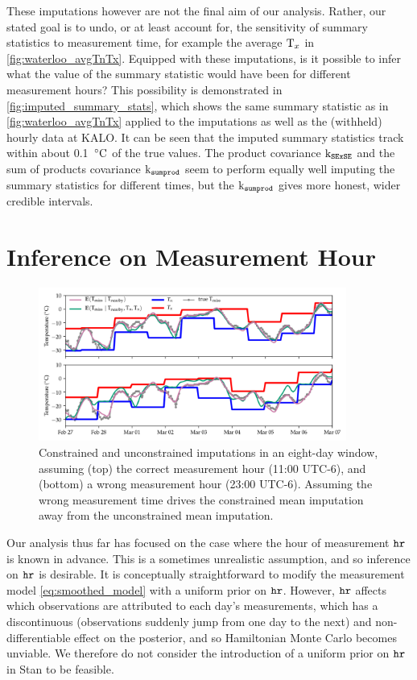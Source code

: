 \documentclass[12pt]{article}
\begin{document}
These imputations however are not the final aim of our analysis.
Rather, our stated goal is to undo, or at least account for, the sensitivity of summary statistics to measurement time, for example the average \(\Tx\) in \autoref{fig:waterloo_avgTnTx}.
Equipped with these imputations, is it possible to infer what the value of the summary statistic would have been for different measurement hours?
This possibility is demonstrated in \autoref{fig:imputed_summary_stats},
which shows the same summary statistic as in \autoref{fig:waterloo_avgTnTx} applied to the imputations as well as the (withheld) hourly data at KALO.
It can be seen that the imputed summary statistics track within about 0.1~\(\degreeC\) of the true values.
The product covariance \(\kSESE\) and the sum of products covariance \(\ksumprod\) seem to perform equally well imputing the summary statistics for different times, but the \(\ksumprod\) gives more honest, wider credible intervals.

\section{Inference on Measurement Hour}\label{inference-on-measurement-hour}

\begin{figure}[tbp]
\centering
\includegraphics[width=0.9\textwidth,height=0.4\textheight,keepaspectratio]{../figures/measure_hour_example.png}
\caption{\label{fig:measure_hour_example} Constrained and unconstrained imputations in an eight-day window, assuming (top) the correct measurement hour (11:00 UTC-6), and (bottom) a wrong measurement hour (23:00 UTC-6). Assuming the wrong measurement time drives the constrained mean imputation away from the unconstrained mean imputation.}
\end{figure}

Our analysis thus far has focused on the case where the hour of measurement \(\hour\) is known in advance.
This is a sometimes unrealistic assumption, and so inference on \(\hour\) is desirable.
It is conceptually straightforward to modify the measurement model \autoref{eq:smoothed_model} with a uniform prior on \(\hour\).
However, \(\hour\) affects which observations are attributed to each day's measurements, which has a 
discontinuous (observations suddenly jump from one day to the next) and non-differentiable effect on the posterior, 
and so Hamiltonian Monte Carlo becomes unviable.
We therefore do not consider the introduction of a uniform prior on \(\hour\) in Stan to be feasible.
\end{document}
